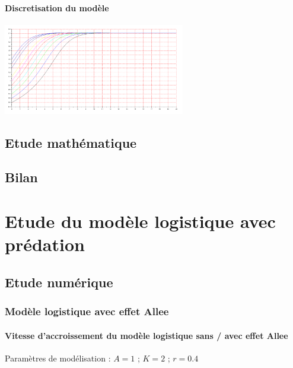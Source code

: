 \documentclass{article}
\begin{document}
\paragraph{Discretisation du modèle}
\begin{center}
\includegraphics[width=300px]{img/part1/TrajPop.png}
\end{center}


\newpage

\subsection{Etude mathématique}


\subsection{Bilan}
\paragraph{}

\newpage
\section{Etude du modèle logistique avec prédation}

\subsection{Etude numérique}

\subsubsection{Modèle logistique avec effet Allee}

\paragraph{Vitesse d'accroissement du modèle logistique sans / avec effet Allee}
\begin{center}
\end{center}
Paramètres de modélisation : $A=1$  ; $K=2$  ; $r=0.4$
\end{document}
